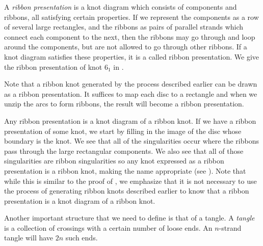 \begin{paper}

A \textit{ribbon presentation} is a knot diagram which consists of components
and ribbons, all satisfying certain properties.
If we represent the components as a row of several large rectangles, and the
ribbons as pairs of parallel strands which connect each component to the next,
then the ribbons may go through and loop around the components, but are not
allowed to go through other ribbons.
If a knot diagram satisfies these properties, it is a called ribbon
presentation.
We give the ribbon presentation of knot $6_1$ in \figPresentation.

Note that a ribbon knot generated by the process described earlier can be drawn
as a ribbon presentation.
It suffices to map each disc to a rectangle and when we unzip the arcs to form
ribbons, the result will become a ribbon presentation.

Any ribbon presentation is a knot diagram of a ribbon knot.
If we have a ribbon presentation of some knot, we start by filling in the image
of the disc whose boundary is the knot.
We see that all of the singularities occur where the ribbons pass through the
large rectangular components.
We also see that all of those singularities are ribbon singularities so any
knot expressed as a ribbon presentation is a ribbon knot, making the name
appropriate (see \figSingularities).
Note that while this is similar to the proof of \prpGeneration, we emphasize
that it is not necessary to use the process of generating ribbon knots described
earlier to know that a ribbon presentation is a knot diagram of a ribbon knot.


Another important structure that we need to define is that of a tangle.
A \textit{tangle} is a collection of crossings with a certain number of loose
ends.
An $n$-strand tangle will have $2n$ such ends.\\


\end{paper}
